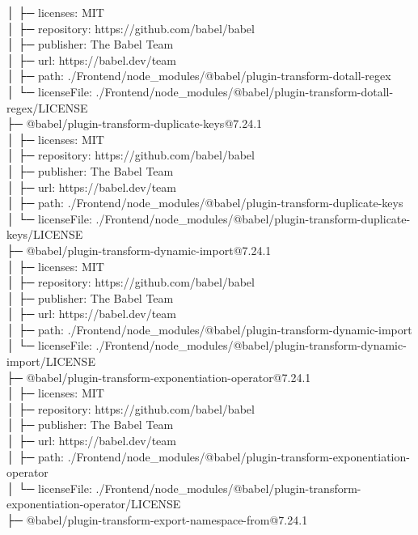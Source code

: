 │  ├─ licenses: MIT\\
│  ├─ repository: https://github.com/babel/babel\\
│  ├─ publisher: The Babel Team\\
│  ├─ url: https://babel.dev/team\\
│  ├─ path: ./Frontend/node\_modules/@babel/plugin-transform-dotall-regex\\
│  └─ licenseFile: ./Frontend/node\_modules/@babel/plugin-transform-dotall-regex/LICENSE\\
├─ @babel/plugin-transform-duplicate-keys@7.24.1\\
│  ├─ licenses: MIT\\
│  ├─ repository: https://github.com/babel/babel\\
│  ├─ publisher: The Babel Team\\
│  ├─ url: https://babel.dev/team\\
│  ├─ path: ./Frontend/node\_modules/@babel/plugin-transform-duplicate-keys\\
│  └─ licenseFile: ./Frontend/node\_modules/@babel/plugin-transform-duplicate-keys/LICENSE\\
├─ @babel/plugin-transform-dynamic-import@7.24.1\\
│  ├─ licenses: MIT\\
│  ├─ repository: https://github.com/babel/babel\\
│  ├─ publisher: The Babel Team\\
│  ├─ url: https://babel.dev/team\\
│  ├─ path: ./Frontend/node\_modules/@babel/plugin-transform-dynamic-import\\
│  └─ licenseFile: ./Frontend/node\_modules/@babel/plugin-transform-dynamic-import/LICENSE\\
├─ @babel/plugin-transform-exponentiation-operator@7.24.1\\
│  ├─ licenses: MIT\\
│  ├─ repository: https://github.com/babel/babel\\
│  ├─ publisher: The Babel Team\\
│  ├─ url: https://babel.dev/team\\
│  ├─ path: ./Frontend/node\_modules/@babel/plugin-transform-exponentiation-operator\\
│  └─ licenseFile: ./Frontend/node\_modules/@babel/plugin-transform-exponentiation-operator/LICENSE\\
├─ @babel/plugin-transform-export-namespace-from@7.24.1\\
